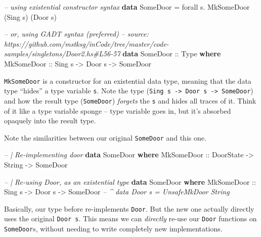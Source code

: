 \documentclass[]{article}
\newenvironment{Shaded}{}{}
\newcommand{\KeywordTok}[1]{\textcolor[rgb]{0.00,0.44,0.13}{\textbf{#1}}}
\newcommand{\DataTypeTok}[1]{\textcolor[rgb]{0.56,0.13,0.00}{#1}}
\newcommand{\CommentTok}[1]{\textcolor[rgb]{0.38,0.63,0.69}{\textit{#1}}}
\newcommand{\OtherTok}[1]{\textcolor[rgb]{0.00,0.44,0.13}{#1}}
\newcommand{\FunctionTok}[1]{\textcolor[rgb]{0.02,0.16,0.49}{#1}}
\newcommand{\NormalTok}[1]{#1}
\begin{document}
\begin{Shaded}
\begin{Highlighting}[]
\CommentTok{-- using existential constructor syntax}
\KeywordTok{data} \DataTypeTok{SomeDoor} \FunctionTok{=}\NormalTok{ forall s}\FunctionTok{.} \DataTypeTok{MkSomeDoor}\NormalTok{ (}\DataTypeTok{Sing}\NormalTok{ s) (}\DataTypeTok{Door}\NormalTok{ s)}

\CommentTok{-- or, using GADT syntax (preferred)}
\CommentTok{-- source: https://github.com/mstksg/inCode/tree/master/code-samples/singletons/Door2.hs#L56-57}
\KeywordTok{data} \DataTypeTok{SomeDoor}\OtherTok{ ::} \DataTypeTok{Type} \KeywordTok{where}
    \DataTypeTok{MkSomeDoor}\OtherTok{ ::} \DataTypeTok{Sing}\NormalTok{ s }\OtherTok{->} \DataTypeTok{Door}\NormalTok{ s }\OtherTok{->} \DataTypeTok{SomeDoor}
\end{Highlighting}
\end{Shaded}

\texttt{MkSomeDoor} is a constructor for an existential data type, meaning that
the data type ``hides'' a type variable \texttt{s}. Note the type
(\texttt{Sing\ s\ -\textgreater{}\ Door\ s\ -\textgreater{}\ SomeDoor}) and how
the result type (\texttt{SomeDoor}) \emph{forgets} the \texttt{s} and hides all
traces of it. Think of it like a type variable sponge -- type variable goes in,
but it's absorbed opaquely into the result type.

Note the similarities between our original \texttt{SomeDoor} and this one.

\begin{Shaded}
\begin{Highlighting}[]
\CommentTok{-- | Re-implementing door}
\KeywordTok{data} \DataTypeTok{SomeDoor} \KeywordTok{where}
    \DataTypeTok{MkSomeDoor}\OtherTok{ ::} \DataTypeTok{DoorState} \OtherTok{->} \DataTypeTok{String} \OtherTok{->} \DataTypeTok{SomeDoor}

\CommentTok{-- | Re-using Door, as an existential type}
\KeywordTok{data} \DataTypeTok{SomeDoor} \KeywordTok{where}
    \DataTypeTok{MkSomeDoor}\OtherTok{  ::} \DataTypeTok{Sing}\NormalTok{ s  }\OtherTok{->} \DataTypeTok{Door}\NormalTok{ s }\OtherTok{->} \DataTypeTok{SomeDoor}
                            \CommentTok{-- ^ data Door s = UnsafeMkDoor String}
\end{Highlighting}
\end{Shaded}

Basically, our type before re-implements \texttt{Door}. But the new one actually
directly uses the original \texttt{Door\ s}. This means we can \emph{directly}
re-use our \texttt{Door} functions on \texttt{SomeDoor}s, without needing to
write completely new implementations.
\end{document}
